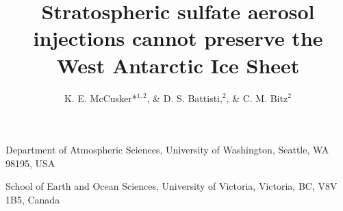 \documentclass{nature}
\title{Stratospheric sulfate aerosol injections cannot preserve the West Antarctic Ice Sheet} %
\author{K. E. McCusker*$^{1,2}$, \& D. S. Battisti,$^{2}$, \& C. M. Bitz$^2$}
\begin{document}
\maketitle

\begin{affiliations}
 \item Department of Atmospheric Sciences, University of Washington, Seattle, WA 98195, USA
 \item School of Earth and Ocean Sciences, University of Victoria, Victoria, BC, V8V 1B5, Canada
\end{affiliations}


\begin{abstract}


\end{abstract}
\end{document}
